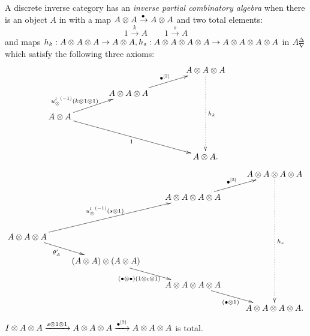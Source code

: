 \begin{definition}\label{def:inverse_partial_combinatory_algebra}
  A discrete inverse category \X has an \emph{inverse partial combinatory algebra} when there is an
   object $A$ in \X with a map $A\otimes A  \xrightarrow{\bullet} A\otimes A$ and two total elements:
  \[
      1\xrightarrow{k}A \qquad 1\xrightarrow{s}{A}
  \]
  and maps
    $h_k:A\otimes A\otimes A\to A\otimes A, h_s:A\otimes A\otimes A\otimes A\to A\otimes A\otimes A\otimes A$  in ${A}^{\Delta}_{\nabla}$ which satisfy the following
    three axioms:\\
    \[
      \xymatrix@C+15pt@R-10pt{
         && A\*A\*A \ar@{.>}[dddd]^{h_k}\\
        &A\* A\* A \ar[ur]^{\imultibullet{2}} \\
        A\*A \ar[ur]^(.4){\inv{\usl}(k\*1\*1)\ \ } \ar[ddrr]_{1} \\
         && & \\
        && A\*A.
      }
    \]
    \[
      \xymatrix@R-10pt{
        &&& A\* A \*A\*A\ar@{.>}[dddddd]^{h_s} \\
        &&A\* A\* A\* A
          \ar[ur]^{\imultibullet{3}}\\
        && \\
        A\* A\* A \ar[uurr]^{\inv{\usl}(s\*1)} \ar[dr]_(.4){\theta_A'}\\
        &(A\* A) \* (A\* A) \ar[dr]_{(\bullet\*\bullet)(1\*c\*1)\ \ } \\
        & &A\* A\* A\*A\ar[dr]_{(\bullet\*1)}\\
        &&&A\*A\*A\*A.\\
      }
    \]
     $I\otimes A\otimes A \xrightarrow{s\otimes1\otimes1} A\otimes A\otimes A \xrightarrow{{\bullet}^{[2]}} A\otimes A\otimes A$ is total.
\end{definition}

